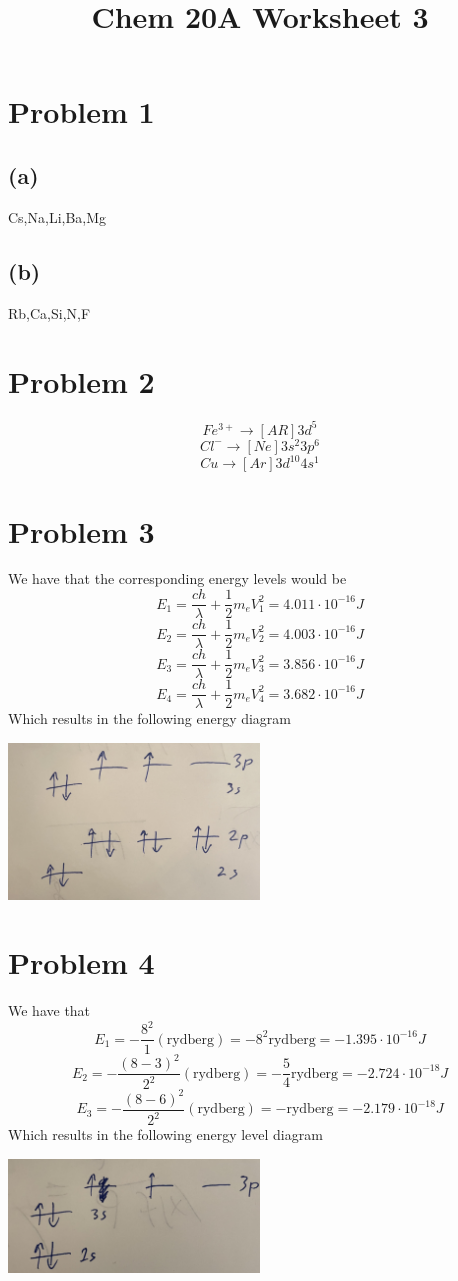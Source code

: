 
\title{Chem 20A Worksheet 3}

\maketitle
\section*{Problem 1}
\subsection*{(a)}
Cs,Na,Li,Ba,Mg
\subsection*{(b)}
Rb,Ca,Si,N,F 
\section*{Problem 2}
$$Fe^{3+}\to [AR]3d^5$$
$$Cl^{-}\to [Ne]3s^2 3p^6$$
$$Cu\to [Ar]3d^{10}4s^1$$
\section*{Problem 3}
We have that the corresponding energy levels 
would be 
$$E_1=\frac{ch}{\lambda}+\frac{1}{2}m_eV_1^2=4.011
\cdot 10^{-16}J$$
$$E_2=\frac{ch}{\lambda}+\frac{1}{2}m_eV_2^2=4.003\cdot
10^{-16}J$$
$$E_3=\frac{ch}{\lambda}+\frac{1}{2}m_eV_3^2=3.856\cdot 
10^{-16}J$$
$$E_4=\frac{ch}{\lambda}+\frac{1}{2}m_eV_4^2=3.682\cdot
10^{-16}J$$
Which results in the following energy diagram
\begin{center}
\includegraphics[width=0.5\textwidth]{problem3.png}
\end{center}
\section*{Problem 4}
We have that 
$$E_1=-\frac{8^2}{1}(\text{rydberg})=-8^2\text{rydberg}=-1.395\cdot 10^{-16}J$$
$$E_2=-\frac{(8-3)^2}{2^2}(\text{rydberg})=-\frac{5}{4}\text{rydberg}=-2.724\cdot 10^{-18}J$$
$$E_3=-\frac{(8-6)^2}{2^2}(\text{rydberg})=-\text{rydberg}=-2.179\cdot 10^{-18}J$$
Which results in the following energy level diagram
\begin{center}
\includegraphics[width=0.5\textwidth]{problem4.png}
\end{center}

